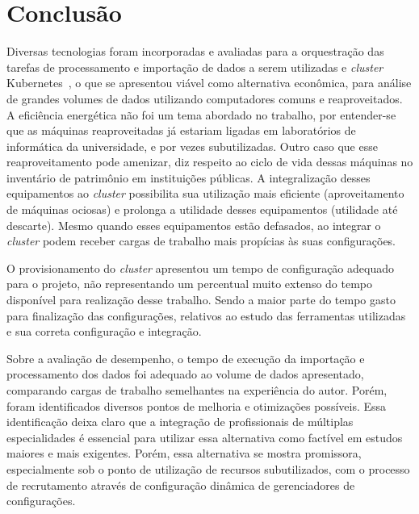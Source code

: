 
\chapter{Conclusão}
\label{chap:conclusao}

Diversas tecnologias foram incorporadas e avaliadas para a orquestração das tarefas de processamento e importação de dados a serem utilizadas e \emph{cluster} Kubernetes\textregistered\ , o que se apresentou viável como alternativa econômica, para análise de grandes volumes de dados utilizando computadores comuns e reaproveitados. A eficiência energética não foi um tema abordado no trabalho, por entender-se que as máquinas reaproveitadas já estariam ligadas em laboratórios de informática da universidade, e por vezes subutilizadas. Outro caso que esse reaproveitamento pode amenizar, diz respeito ao ciclo de vida dessas máquinas no inventário de patrimônio em instituições públicas. A integralização desses equipamentos ao \emph{cluster} possibilita sua utilização mais eficiente (aproveitamento de máquinas ociosas) e prolonga a utilidade desses equipamentos (utilidade até descarte). Mesmo quando esses equipamentos estão defasados, ao integrar o \emph{cluster} podem receber cargas de trabalho mais propícias às suas configurações. 

O provisionamento do \emph{cluster} apresentou um tempo de configuração adequado para o projeto, não representando um percentual muito extenso do tempo disponível para realização desse trabalho. Sendo a maior parte do tempo gasto para finalização das configurações, relativos ao estudo das ferramentas utilizadas e sua correta configuração e integração. 

Sobre a avaliação de desempenho, o tempo de execução da importação e processamento dos dados foi adequado ao volume de dados apresentado, comparando cargas de trabalho semelhantes na experiência do autor. Porém, foram identificados diversos pontos de melhoria e otimizações possíveis. Essa identificação deixa claro que a integração de profissionais de múltiplas especialidades é essencial para utilizar essa alternativa como factível em estudos maiores e mais exigentes. Porém, essa alternativa se mostra promissora, especialmente sob o ponto de utilização de recursos subutilizados, com o processo de recrutamento através de configuração dinâmica de gerenciadores de configurações. 

